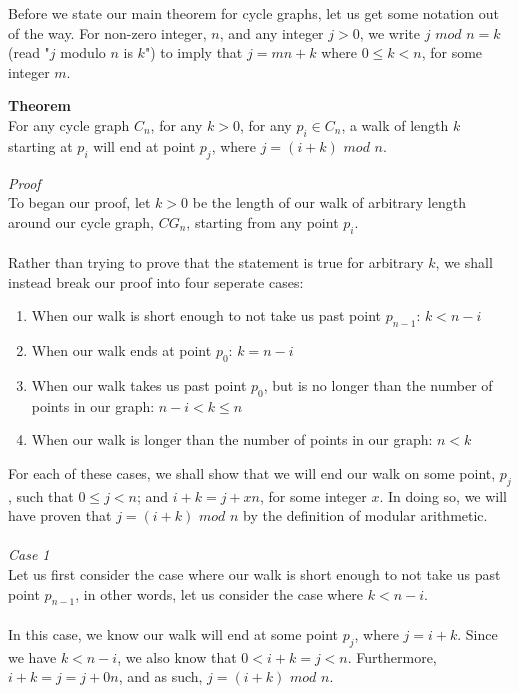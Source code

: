\documentclass[a4paper,12pt]{article}
\begin{document}
Before we state our main theorem for cycle graphs, let us get some notation out of the way. For non-zero integer, $n$, and any integer $j > 0$, we write $j$ $mod$ $n = k$ (read "$j$ modulo $n$ is $k$") to imply that $j = mn + k$ where $0 \leq k < n$, for some integer $m$.\\
\begin{tcolorbox}
\textbf{Theorem}\\
For any cycle graph $C_n$, for any $k > 0$, for any $p_i \in C_n$, a walk of length $k$ starting at $p_i$ will end at point $p_j$, where $j = (i + k)$ $mod$ $n$.\\
\end{tcolorbox}
\noindent
\textit{Proof}\\
To began our proof, let $k > 0$ be the length of our walk of arbitrary length around our cycle graph, $CG_n$, starting from any point $p_i$.\\
\\
Rather than trying to prove that the statement is true for arbitrary $k$, we shall instead break our proof into four seperate cases:
\begin{enumerate}
\item When our walk is short enough to not take us past point $p_{n-1}$: $k < n -i$
\item When our walk ends at point $p_0$: $k = n - i$
\item When our walk takes us past point $p_0$, but is no longer than the number of points in our graph: $n - i < k \leq n$
\item When our walk is longer than the number of points in our graph: $n < k$
\end{enumerate}
For each of these cases, we shall show that we will end our walk on some point, $p_j$, such that $0 \leq j < n$; and $i + k = j + xn$, for some integer $x$. In doing so, we will have proven that $j = (i +k)$ $mod$ $n$ by the definition of modular arithmetic.\\
\\ 
\textit{Case 1}\\
Let us first consider the case where our walk is short enough to not take us past point $p_{n-1}$, in other words, let us consider the case where $k < n - i$.\\
\\
In this case, we know our walk will end at some point $p_j$, where $j = i + k$. Since we have $k < n - i$, we also know that $0 < i + k = j < n$. Furthermore, $i + k = j = j + 0n$, and as such, $j = (i + k)$ $mod$ $n$.\\
\end{document}
